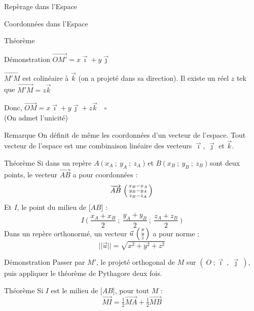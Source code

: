 \documentclass{cours}
\begin{document}
\begin{Gpartie}{Repèrage dans l'Espace}
\begin{Spartie}{Coordonnées dans l'Espace}
\begin{SSpartie}{Théorème}
\begin{SSSpartie}{Démonstration}
                    $\overrightarrow{OM'}=x\vec{\imath}+y\vec{\jmath}$

                    $\overrightarrow{M'M}$ est colinéaire à $\vec{k}$ (on a projeté dans sa direction). Il existe un réel $z$ tek que $\overrightarrow{M'M}=z\vec{k}$

                    Donc, $\overrightarrow{OM}=x\vec{\imath}+y\vec{\jmath}+z\vec{k}\quad\square$ \\
                    (On admet l'unicité)
                \end{SSSpartie}
                \begin{SSSpartie}{Remarque} 
                    On définit de même les coordonnées d'un vecteur de l'espace. Tout vecteur de l'espace est une combinaison linéaire des vecteurs $\vec{\imath}$, $\vec{\jmath}$ et $\vec{k}$.
                \end{SSSpartie}
            \end{SSpartie}
            \begin{SSpartie}{Théorème} 
                Si dans un repère $A~\big(~x_A~;~y_A~;~z_A~\big)$ et $B~\big(~x_B~;~y_B~;~z_B~\big)$ sont deux points, le vecteur $\overrightarrow{AB}$ a pour coordonnées : 
                \[\overrightarrow{AB}~\begin{psmallmatrix} x_B-x_A \\ y_B-y_A \\ z_B-z_A \end{psmallmatrix}\]
                Et $I$, le point du milieu de $\big[AB\big]$ :
                \[I~\Bigg(~\frac{x_A+x_B}{2}~;~\frac{y_A+y_B}{2}~;~\frac{z_A+z_B}{2}~\Bigg)\]
                Dans un repère orthonormé, un vecteur $\vec{u}~\begin{psmallmatrix}x \\ y \\ z\end{psmallmatrix}$ a pour norme :
                \[\lvert\lvert\vec{u}\rvert\rvert=\sqrt{x^2+y^2+z^2}\]
                \begin{SSSpartie}{Démonstration} 
                    Passer par $M'$, le projeté orthogonal de $M$ sur $\left(~O~;\vec{\imath}~,~\vec{\jmath}~\right)$, puis appliquer le théorème de Pythagore deux fois.
                \end{SSSpartie}
            \end{SSpartie}
            \begin{SSpartie}{Théorème} 
                Si $I$ est le milieu de $\big[AB\big]$, pour tout $M$ :
                \[\overrightarrow{MI}=\tfrac{1}{2}\overrightarrow{MA}+\tfrac{1}{2}\overrightarrow{MB}\]

\end{SSpartie}
\end{Spartie}
\end{Gpartie}
\end{document}
